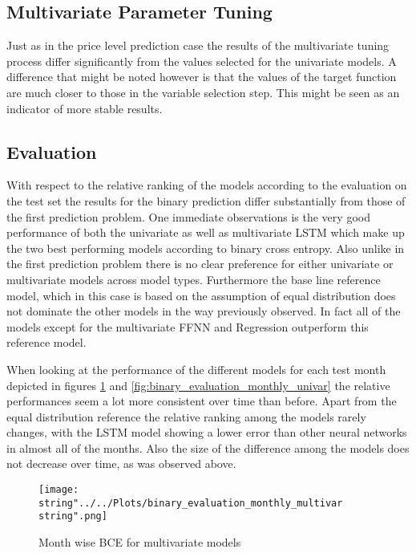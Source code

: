 \subsection{Multivariate Parameter Tuning}
Just as in the price level prediction case the results of the multivariate tuning process differ significantly from the values selected for the univariate models. A difference that might be noted however is that the values of the target function are much closer to those in the variable selection step. This might be seen as an indicator of more stable results. 

\subsection{Evaluation}
With respect to the relative ranking of the models according to the evaluation on the test set the results for the binary prediction differ substantially from those of the first prediction problem. One  immediate observations is the very good performance of both the univariate as well as multivariate LSTM which make up the two best performing models according to binary cross entropy. Also unlike in the first prediction problem there is no clear preference for either univariate or multivariate models across model types. Furthermore the base line reference model, which in this case is based on the assumption of equal distribution does not dominate the other models in the way previously observed. In fact all of the models except for the multivariate FFNN and Regression outperform this reference model. 


When looking at the performance of the different models for each test month depicted in figures \ref{fig:binary_evaluation_monthly_multivar} and \ref{fig:binary_evaluation_monthly_univar} the relative performances seem a lot more consistent over time than before. Apart from the equal distribution reference the relative ranking among the models rarely changes, with the LSTM model showing a lower error than other neural networks in almost all of the months. Also the size of the difference among the models does not decrease over time, as was observed above.
\begin{figure}[h!]
  \centering
\texttt{[image: \\string"../../Plots/binary\_evaluation\_monthly\_multivar\\string".png]}
  \caption{Month wise BCE for multivariate models}\label{fig:binary_evaluation_monthly_multivar}
\end{figure}

